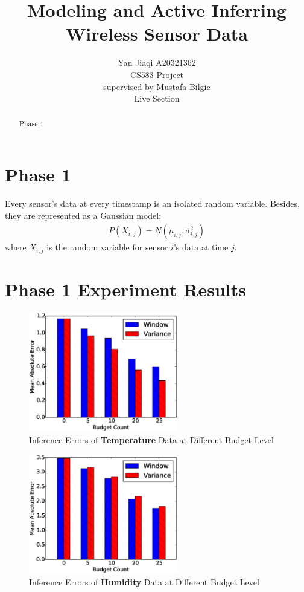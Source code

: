 \documentclass[12pt]{article}  %
\title{Modeling and Active Inferring Wireless Sensor Data}
\author{Yan Jiaqi A20321362\\
CS583 Project\\
supervised by
Mustafa Bilgic\\
Live Section
}
\theoremstyle{definition}
\theoremstyle{remark}
\begin{document}
\maketitle

\begin{abstract}
Phase 1
\end{abstract}

\newpage
\tableofcontents

\newpage

\section{Phase 1}
Every sensor's data at every timestamp is an isolated random variable.
Besides, they are represented as a Gaussian model:
\begin{align}
        P(X_{i,j}) = N(\mu_{i,j}, \sigma_{i,j}^2)
\end{align}
where $X_{i, j}$ is the random variable for sensor $i$'s data at time $j$.

\section{Phase 1 Experiment Results}
\label{sec:phase1:result}

\begin{figure}[h]
\centering
        \includegraphics[width=0.58\textwidth]{../phase1/temperature_err}
        \caption{Inference Errors of \textbf{Temperature} Data at Different Budget Level}
\label{fig:phase1:temperature}
\end{figure}

\begin{figure}[h]
\centering
        \includegraphics[width=0.58\textwidth]{../phase1/humidity_err}
        \caption{Inference Errors of \textbf{Humidity} Data at Different Budget Level}
\label{fig:phase1:humidity}
\end{figure}
\end{document}
